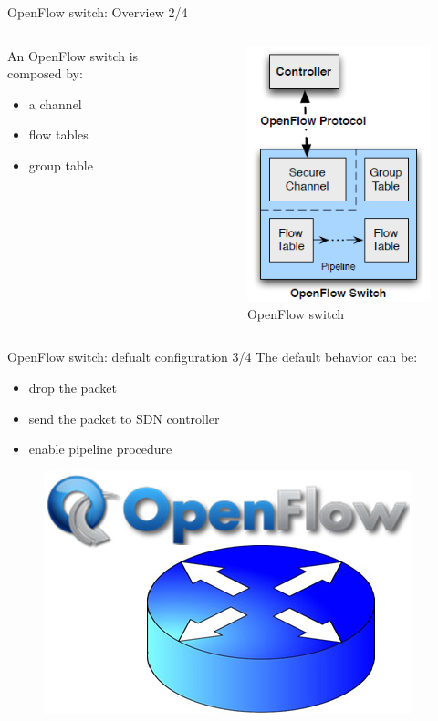\begin{frame}{OpenFlow switch: \small{Overview 2/4}}
\begin{columns}
\begin{column}{0.55\textwidth}
An OpenFlow switch is composed by:
\begin{itemize}
\item<2-> a channel
\item<3-> flow tables
\item<4-> group table
\end{itemize}
\end{column}
\begin{column}{0.45\textwidth}
\begin{figure}
\includegraphics[scale=0.50]{Immagini/OpenFlowSwitch.png}
\caption{OpenFlow switch}
\label{fig:OpenFlowSwitchComponent}
\end{figure}
\end{column}
\end{columns}
\end{frame}

\begin{frame}{OpenFlow switch: \small{defualt configuration 3/4}}
The default behavior can be:
\begin{itemize}
\item<2-> drop the packet
\item<3-> send the packet to SDN controller
\item<4-> enable pipeline procedure
\end{itemize}
\begin{figure}
\includegraphics[scale=0.25]{Immagini/OpenFlowSwitchRouter.jpg}
\end{figure}
\end{frame}

